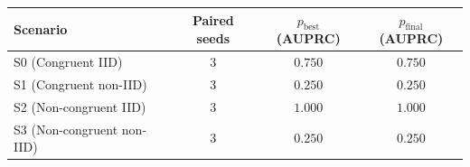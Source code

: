 \begin{tabular}{lccc}
\toprule
Scenario & Paired seeds & $p_{\mathrm{best}}$ (AUPRC) & $p_{\mathrm{final}}$ (AUPRC) \\
\midrule
S0 (Congruent IID) & 3 & $0.750$ & $0.750$ \\
S1 (Congruent non-IID) & 3 & $0.250$ & $0.250$ \\
S2 (Non-congruent IID) & 3 & $1.000$ & $1.000$ \\
S3 (Non-congruent non-IID) & 3 & $0.250$ & $0.250$ \\
\bottomrule
\end{tabular}
